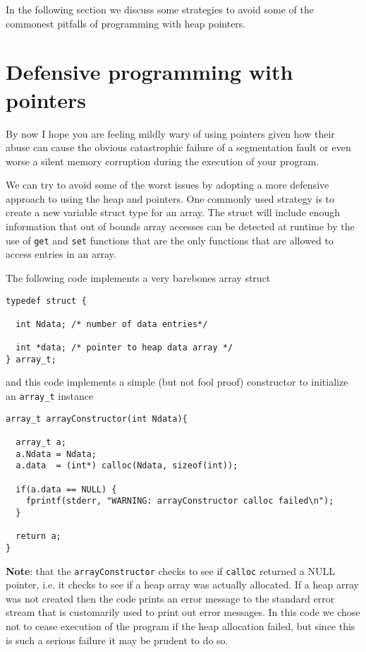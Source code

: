 In the following section we discuss some strategies to avoid some of the commonest pitfalls of programming with heap pointers.

\section{Defensive programming with pointers}
\label{array.sec}

By now I hope you are feeling mildly wary of using pointers given how their abuse can cause the obvious catastrophic failure of a segmentation fault or even worse a silent memory corruption during the execution of your program.

We can try to avoid some of the worst issues by adopting a more defensive approach to using the heap and pointers. One commonly used strategy is to create a new variable struct type for an array. The struct will include enough information that out of bounds array accesses can be detected at runtime by the use of \texttt{get} and \texttt{set} functions that are the only functions that are allowed to access entries in an array.

The following code implements a very barebones array struct 

\begin{verbatim}
typedef struct {

  int Ndata; /* number of data entries*/

  int *data; /* pointer to heap data array */
} array_t;
\end{verbatim}

and this code implements a simple (but not fool proof) constructor to initialize an \texttt{array\_t} instance

\begin{verbatim}
array_t arrayConstructor(int Ndata){

  array_t a;
  a.Ndata = Ndata;
  a.data  = (int*) calloc(Ndata, sizeof(int));

  if(a.data == NULL) {
    fprintf(stderr, "WARNING: arrayConstructor calloc failed\n");
  }

  return a;
}
\end{verbatim}

{\bf Note}: that the \texttt{arrayConstructor} checks to see if \texttt{calloc} returned a NULL pointer, i.e. it checks to see if a heap array was actually allocated. If a heap array was not created then the code prints an error message to the standard error stream that is customarily used to print out error messages. In this code we chose not to cease execution of the program if the heap allocation failed, but since this is such a serious failure it may be prudent to do so.

